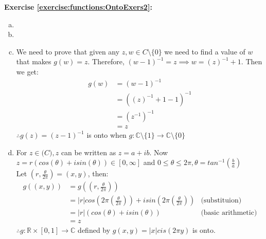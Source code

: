 \noindent\textbf{Exercise \ref{exercise:functions:OntoExers2}:} %
\begin{enumerate}[(a)]
\item

\item

\item
We need to prove that given any $z,w\in C\setminus \{0\}$ we need to find a value of $w$ that makes $g(w)=z$. Therefore, $(w-1)^{-1}=z \implies w=(z)^{-1}+1$. Then we get:
\begin{align*}
g(w) &=(w-1)^{-1}\\
&=((z)^{-1}+1-1)^{-1}\\
&=(z^{-1})^{-1}\\
&=z
\end{align*}
$\therefore g(z)=(z-1)^{-1}$ is onto when $g\colon {\mathbb C}\setminus \{1\}\to {\mathbb C}\setminus \{0\}$

\item
For $z\in \mathbb(C), z$ can be written as $z=a+ib$. Now $z=r(cos(\theta)+isin(\theta))\in [0,\infty]$ and $0\leq \theta \leq 2\pi, \theta=tan^{-1}(\frac{b}{a})$\\
Let $(r,\frac{\theta}{2\pi})=(x,y)$, then:
\begin{align*}
g((x,y))&=g((r,\frac{\theta}{2\pi})) &\\
&=|r|cos(2\pi(\frac{\theta}{2\pi}))+isin(2\pi(\frac{\theta}{2\pi})) & \text{(substituion)} \\
&=|r|(cos(\theta)+isin(\theta)) & \text{(basic arithmetic)}\\
&=z 
\end{align*}
$\therefore g\colon \mathbb{R}\times [0,1]\to \mathbb{C}$ defined by $g(x,y)=|x|cis(2\pi y)$ is onto.
\end{enumerate}

